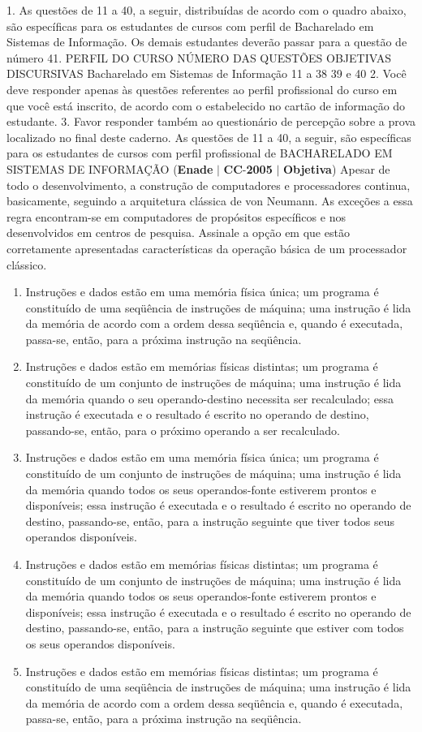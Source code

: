 \documentclass{exam}
\begin{document}
\begin{questions}
1. As questões de 11 a 40, a seguir, distribuídas de acordo com o quadro abaixo, são
específicas para os estudantes de cursos com perfil de Bacharelado em Sistemas de
Informação. Os demais estudantes deverão passar para a questão de número 41.
PERFIL DO CURSO
NÚMERO DAS QUESTÕES
OBJETIVAS DISCURSIVAS
Bacharelado em Sistemas de Informação 11 a 38 39 e 40
2. Você deve responder apenas às questões referentes ao perfil profissional do curso em que
você está inscrito, de acordo com o estabelecido no cartão de informação do estudante.
3. Favor responder também ao questionário de percepção sobre a prova localizado no final
deste caderno.
As questões de 11 a 40, a seguir, são específicas para os estudantes de cursos com perfil profissional de
BACHARELADO EM SISTEMAS DE INFORMAÇÃO
\question (\textbf{Enade} $|$ \textbf{CC}-\textbf{2005} $|$ \textbf{Objetiva})
Apesar de todo o desenvolvimento, a construção de computadores
e processadores continua, basicamente, seguindo a arquitetura
clássica de von Neumann. As exceções a essa regra encontram-se
em computadores de propósitos específicos e nos desenvolvidos
em centros de pesquisa. Assinale a opção em que estão
corretamente apresentadas características da operação básica de
um processador clássico.
	\begin{enumerate}[label=\alph*)]
		\item  Instruções e dados estão em uma memória física única; um
programa é constituído de uma seqüência de instruções de
máquina; uma instrução é lida da memória de acordo com a
ordem dessa seqüência e, quando é executada, passa-se, então,
para a próxima instrução na seqüência.
		\item  Instruções e dados estão em memórias físicas distintas; um
programa é constituído de um conjunto de instruções de
máquina; uma instrução é lida da memória quando o seu
operando-destino necessita ser recalculado; essa instrução é
executada e o resultado é escrito no operando de destino,
passando-se, então, para o próximo operando a ser recalculado.
		\item  Instruções e dados estão em uma memória física única; um
programa é constituído de um conjunto de instruções de
máquina; uma instrução é lida da memória quando todos os
seus operandos-fonte estiverem prontos e disponíveis; essa
instrução é executada e o resultado é escrito no operando de
destino, passando-se, então, para a instrução seguinte que tiver
todos seus operandos disponíveis.
		\item  Instruções e dados estão em memórias físicas distintas; um
programa é constituído de um conjunto de instruções de
máquina; uma instrução é lida da memória quando todos os
seus operandos-fonte estiverem prontos e disponíveis; essa
instrução é executada e o resultado é escrito no operando de
destino, passando-se, então, para a instrução seguinte que
estiver com todos os seus operandos disponíveis.
		\item  Instruções e dados estão em memórias físicas distintas; um
programa é constituído de uma seqüência de instruções de
máquina; uma instrução é lida da memória de acordo com a
ordem dessa seqüência e, quando é executada, passa-se, então,
para a próxima instrução na seqüência.
	\end{enumerate}


\end{questions}
\end{document}
